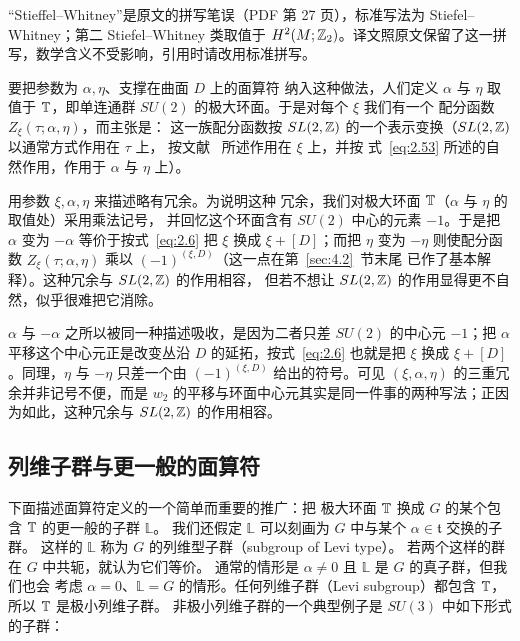 \begin{yizhu}[原文疑误]
“Stieffel–Whitney”是原文的拼写笔误（PDF 第 27 页），标准写法为 Stiefel–Whitney；第二 Stiefel–Whitney 类取值于 $H^2(M;{\mathbb{Z}}_2)$。译文照原文保留了这一拼写，数学含义不受影响，引用时请改用标准拼写。
\end{yizhu}

要把参数为 $\alpha,\eta$、支撑在曲面 $D$ 上的面算符
纳入这种做法，人们定义
$\alpha$ 与 $\eta$ 取值于 ${\mathbb{T}}$，即单连通群 $SU(2)$ 的极大环面。于是对每个 $\xi$ 我们有一个
配分函数 $Z_\xi(\tau;\alpha,\eta)$，而主张是：
这一族配分函数按 $SL(2,{\mathbb{Z}})$ 的一个表示变换（$SL(2,{\mathbb{Z}})$ 以通常方式作用在 $\tau$ 上，
按文献~\cite{ref48} 所述作用在 $\xi$ 上，并按
式~\eqref{eq:2.53} 所述的自然作用，作用于 $\alpha$ 与
$\eta$ 上）。

用参数 $\xi,\alpha,\eta$ 来描述略有冗余。为说明这种
冗余，我们对极大环面 ${\mathbb{T}}$（$\alpha$ 与 $\eta$ 的取值处）采用乘法记号，
并回忆这个环面含有 $SU(2)$ 中心的元素 $-1$。于是把 $\alpha$ 变为 $-\alpha$ 等价于按式~\eqref{eq:2.6} 把 $\xi$ 换成
$\xi+[D]$；而把 $\eta$ 变为 $-\eta$ 则使配分函数
$Z_\xi(\tau;\alpha,\eta)$ 乘以 $(-1)^{(\xi,D)}$（这一点在第~\ref{sec:4.2}~节末尾
已作了基本解释）。这种冗余与 $SL(2,{\mathbb{Z}})$ 的作用相容，
但若不想让 $SL(2,{\mathbb{Z}})$ 的作用显得更不自然，似乎很难把它消除。

\begin{yizhu}[含糊点拨]
$\alpha$ 与 $-\alpha$ 之所以被同一种描述吸收，是因为二者只差 $SU(2)$ 的中心元 $-1$；把 $\alpha$ 平移这个中心元正是改变丛沿 $D$ 的延拓，按式~\eqref{eq:2.6} 也就是把 $\xi$ 换成 $\xi+[D]$。同理，$\eta$ 与 $-\eta$ 只差一个由 $(-1)^{(\xi,D)}$ 给出的符号。可见 $(\xi,\alpha,\eta)$ 的三重冗余并非记号不便，而是 $w_2$ 的平移与环面中心元其实是同一件事的两种写法；正因为如此，这种冗余与 $SL(2,{\mathbb{Z}})$ 的作用相容。
\end{yizhu}

\subsection{列维子群与更一般的面算符}

\label{sec:2.6}

下面描述面算符定义的一个简单而重要的推广：把
极大环面 ${\mathbb{T}}$ 换成 $G$ 的某个包含 ${\mathbb{T}}$ 的更一般的子群 $\mathbb{L}$。
我们还假定 $\mathbb{L}$ 可以刻画为 $G$ 中与某个 $\alpha\in \mathfrak t$ 交换的子群。
这样的 $\mathbb{L}$ 称为 $G$ 的列维型子群（subgroup of Levi type）。
若两个这样的群在 $G$ 中共轭，就认为它们等价。
通常的情形是 $\alpha\not= 0$ 且 $\mathbb{L}$ 是 $G$ 的真子群，但我们也会
考虑 $\alpha=0$、$\mathbb{L}=G$ 的情形。任何列维子群（Levi subgroup）都包含 ${\mathbb{T}}$，所以 ${\mathbb{T}}$ 是极小列维子群。
非极小列维子群的一个典型例子是 $SU(3)$ 中如下形式的子群：

